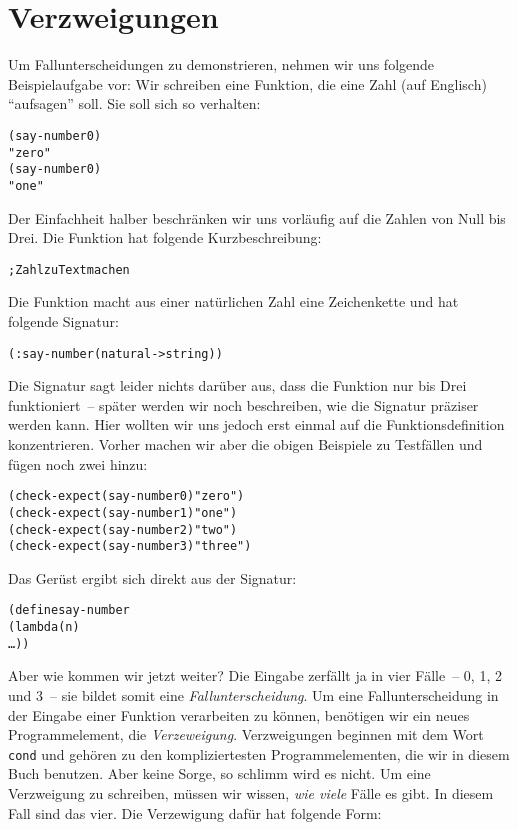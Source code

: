 \section{Verzweigungen}

Um Fallunterscheidungen zu demonstrieren, nehmen wir uns folgende
Beispielaufgabe vor: Wir schreiben eine Funktion, die eine Zahl (auf
Englisch) "`aufsagen"' soll.  Sie soll sich so verhalten:
%
\begin{alltt}
(say-number 0)
\evalsto{} "zero"
(say-number 0)
\evalsto{} "one"
\end{alltt}
%
Der Einfachheit halber beschränken wir uns vorläufig auf die Zahlen
von Null bis Drei.  Die Funktion hat folgende Kurzbeschreibung:
%
\begin{alltt}
; Zahl zu Text machen
\end{alltt}
%
Die Funktion macht aus einer natürlichen Zahl eine Zeichenkette und
hat folgende Signatur:
%
\begin{alltt}
(: say-number (natural -> string))
\end{alltt}
%
Die Signatur sagt leider nichts darüber aus, dass die Funktion nur bis
Drei funktioniert~-- später werden wir noch beschreiben, wie die
Signatur präziser werden kann.  Hier wollten wir uns jedoch erst
einmal auf die Funktionsdefinition konzentrieren.  Vorher machen wir
aber die obigen Beispiele zu Testfällen und fügen noch zwei hinzu:
%
\begin{alltt}
(check-expect (say-number 0) "zero")
(check-expect (say-number 1) "one")
(check-expect (say-number 2) "two")
(check-expect (say-number 3) "three")
\end{alltt}
%
Das Gerüst ergibt sich direkt aus der Signatur:
%
\begin{alltt}
(define say-number
  (lambda (n)
    \ldots))
\end{alltt}
%
Aber wie kommen wir jetzt weiter?  Die Eingabe zerfällt ja in vier
Fälle~-- 0, 1, 2 und 3~-- sie bildet somit eine
\textit{Fallunterscheidung}.  Um eine
Fallunterscheidung in der Eingabe einer Funktion verarbeiten zu können,
benötigen wir ein neues Programmelement, die
\textit{Verzeweigung}.  Verzweigungen beginnen mit
dem Wort \texttt{cond} und gehören zu den kompliziertesten
Programmelementen, die wir in diesem Buch benutzen.  Aber keine Sorge,
so schlimm wird es nicht.  Um eine Verzweigung zu schreiben, müssen
wir wissen, \emph{wie viele} Fälle es gibt.  In diesem Fall sind das
vier.  Die Verzewigung dafür hat folgende Form:
%

